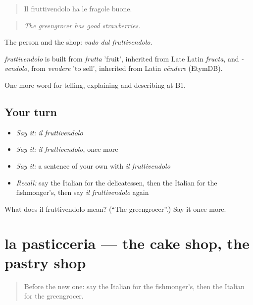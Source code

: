\begin{quote}
Il fruttivendolo ha le fragole buone.
\end{quote}

\begin{quote}
\emph{The greengrocer has good strawberries.}
\end{quote}

The person and the shop: \emph{vado dal fruttivendolo}.

\begin{cousinweb}
\emph{fruttivendolo} is built from \emph{frutta} 'fruit', inherited from Late Latin \emph{fructa}, and \emph{-vendolo}, from \emph{vendere} 'to sell', inherited from Latin \emph{vēndere} (EtymDB).
\end{cousinweb}

\begin{grammarlens}[title={What you've built}]
One more word for telling, explaining and describing at B1.
\end{grammarlens}

\subsection*{Your turn}
\begin{itemize}
\raggedright
  \item \emph{Say it:} \emph{il fruttivendolo}
  \item \emph{Say it:} \emph{il fruttivendolo}, once more
  \item \emph{Say it:} a sentence of your own with \emph{il fruttivendolo}
  \item \emph{Recall:} say the Italian for the delicatessen, then the Italian for the fishmonger's, then say \emph{il fruttivendolo} again
\end{itemize}

\begin{tcolorbox}[breakable,colback=teal!4,colframe=teal!35!black,title={Before you move on}]
What does il fruttivendolo mean? (\textquotedblleft{}The greengrocer\textquotedblright{}.) Say it once more.
\end{tcolorbox}
\section[la pasticceria]{la pasticceria — the cake shop, the pastry shop}

\label{lesson:IT-C454-pasticceria}



\begin{quote}
Before the new one: say the Italian for the fishmonger's, then the Italian for the greengrocer.
\end{quote}

